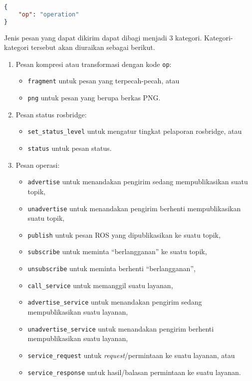 \begin{lstlisting}[language=JSON, caption=contoh pesan valid pada lapisan transpor rosbridge]
{
    "op": "operation"
}
\end{lstlisting}

Jenis pesan yang dapat dikirim dapat dibagi menjadi 3 kategori.
Kategori-kategori tersebut akan diuraikan sebagai berikut.
\begin{enumerate}
      \item Pesan kompresi atau transformasi dengan kode \texttt{op}:
            \begin{itemize}
                  \item \texttt{fragment} untuk pesan yang terpecah-pecah, atau
                  \item \texttt{png} untuk pesan yang berupa berkas PNG.
            \end{itemize}
      \item Pesan status rosbridge:
            \begin{itemize}
                  \item \texttt{set\_status\_level} untuk mengatur tingkat pelaporan
                        rosbridge, atau
                  \item \texttt{status} untuk pesan status.
            \end{itemize}
      \item Pesan operasi:
            \begin{itemize}
                  \item \texttt{advertise} untuk menandakan pengirim sedang
                        mempublikasikan suatu topik,
                  \item \texttt{unadvertise} untuk menandakan pengirim berhenti
                        mempublikasikan suatu topik,
                  \item \texttt{publish} untuk pesan ROS yang dipublikasikan ke
                        suatu topik,
                  \item \texttt{subscribe} untuk meminta ``berlangganan'' ke suatu
                        topik,
                  \item \texttt{unsubscribe} untuk meminta berhenti ``berlangganan'',
                  \item \texttt{call\_service} untuk memanggil suatu layanan,
                  \item \texttt{advertise\_service} untuk menandakan pengirim sedang
                        mempublikasikan suatu layanan, \item \texttt{unadvertise\_service}
                        untuk menandakan pengirim berhenti mempublikasikan suatu layanan,
                  \item \texttt{service\_request} untuk \textit{request}/permintaan
                        ke suatu layanan, atau \item \texttt{service\_response} untuk
                        hasil/balasan permintaan ke suatu layanan.
            \end{itemize}
\end{enumerate}

